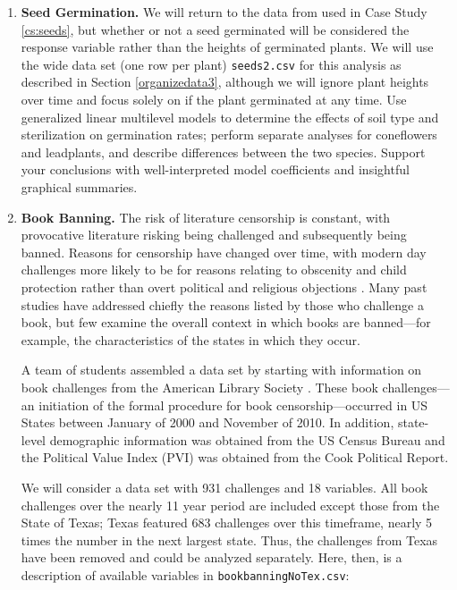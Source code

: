 \documentclass[
]{krantz}
\begin{document}
\begin{enumerate}
\def\labelenumi{\arabic{enumi}.}
\setcounter{enumi}{1}
\item
  \textbf{Seed Germination.} We will return to the data from \citet{Angell2010} used in Case Study \ref{cs:seeds}, but whether or not a seed germinated will be considered the response variable rather than the heights of germinated plants. We will use the wide data set (one row per plant) \texttt{seeds2.csv} for this analysis as described in Section \ref{organizedata3}, although we will ignore plant heights over time and focus solely on if the plant germinated at any time. Use generalized linear multilevel models to determine the effects of soil type and sterilization on germination rates; perform separate analyses for coneflowers and leadplants, and describe differences between the two species. Support your conclusions with well-interpreted model coefficients and insightful graphical summaries.
\item
  \textbf{Book Banning.} The risk of literature censorship is constant, with provocative literature risking being challenged and subsequently being banned. Reasons for censorship have changed over time, with modern day challenges more likely to be for reasons relating to obscenity and child protection rather than overt political and religious objections \citep{Jenkins2006}. Many past studies have addressed chiefly the reasons listed by those who challenge a book, but few examine the overall context in which books are banned---for example, the characteristics of the states in which they occur.

  A team of students assembled a data set by starting with information on book challenges from the American Library Society \citep{Fast2011}. These book challenges---an initiation of the formal procedure for book censorship---occurred in US States between January of 2000 and November of 2010. In addition, state-level demographic information was obtained from the US Census Bureau and the Political Value Index (PVI) was obtained from the Cook Political Report.

  We will consider a data set with 931 challenges and 18 variables. All book challenges over the nearly 11 year period are included except those from the State of Texas; Texas featured 683 challenges over this timeframe, nearly 5 times the number in the next largest state. Thus, the challenges from Texas have been removed and could be analyzed separately. Here, then, is a description of available variables in \texttt{bookbanningNoTex.csv}:


\end{enumerate}
\end{document}
